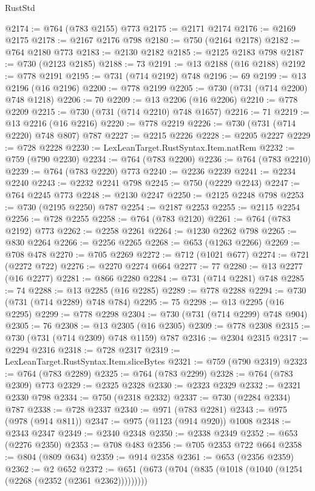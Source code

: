 \begin{lexlean}{RustStd}
\begin{coremodule}
@2174 := @764 (@783 @2155) @773
@2175 := @2171 @2174
@2176 := @2169 @2175
@2178 := @2167 @2176 @798
@2180 := @750 (@2164 @2178)
@2182 := @764 @2180 @773
@2183 := @2130 @2182
@2185 := @2125 @2183 @798
@2187 := @730 (@2123 @2185)
@2188 := 73
@2191 := @13 @2188 (@16 @2188)
@2192 := @778 @2191
@2195 := @731 (@714 @2192) @748
@2196 := 69
@2199 := @13 @2196 (@16 @2196)
@2200 := @778 @2199
@2205 := @730 (@731 (@714 @2200) @748 @1218)
@2206 := 70
@2209 := @13 @2206 (@16 @2206)
@2210 := @778 @2209
@2215 := @730 (@731 (@714 @2210) @748 @1657)
@2216 := 71
@2219 := @13 @2216 (@16 @2216)
@2220 := @778 @2219
@2226 := @730 (@731 (@714 @2220) @748 @807) @787
@2227 := @2215 @2226
@2228 := @2205 @2227
@2229 := @728 @2228
@2230 := LexLeanTarget.RustSyntax.Item.natRem
@2232 := @759 (@790 @2230)
@2234 := @764 (@783 @2200)
@2236 := @764 (@783 @2210)
@2239 := @764 (@783 @2220) @773
@2240 := @2236 @2239
@2241 := @2234 @2240
@2243 := @2232 @2241 @798
@2245 := @750 (@2229 @2243)
@2247 := @764 @2245 @773
@2248 := @2130 @2247
@2250 := @2125 @2248 @798
@2253 := @730 (@2195 @2250) @787
@2254 := @2187 @2253
@2255 := @2115 @2254
@2256 := @728 @2255
@2258 := @764 (@783 @2120)
@2261 := @764 (@783 @2192) @773
@2262 := @2258 @2261
@2264 := @1230 @2262 @798
@2265 := @830 @2264
@2266 := @2256 @2265
@2268 := @653 (@1263 @2266)
@2269 := @708 @478
@2270 := @705 @2269
@2272 := @712 (@1021 @677)
@2274 := @721 (@2272 @722)
@2276 := @2270 @2274 @664
@2277 := 77
@2280 := @13 @2277 (@16 @2277)
@2281 := @866 @2280
@2284 := @731 (@714 @2281) @748
@2285 := 74
@2288 := @13 @2285 (@16 @2285)
@2289 := @778 @2288
@2294 := @730 (@731 (@714 @2289) @748 @784)
@2295 := 75
@2298 := @13 @2295 (@16 @2295)
@2299 := @778 @2298
@2304 := @730 (@731 (@714 @2299) @748 @904)
@2305 := 76
@2308 := @13 @2305 (@16 @2305)
@2309 := @778 @2308
@2315 := @730 (@731 (@714 @2309) @748 @1159) @787
@2316 := @2304 @2315
@2317 := @2294 @2316
@2318 := @728 @2317
@2319 := LexLeanTarget.RustSyntax.Item.sliceBytes
@2321 := @759 (@790 @2319)
@2323 := @764 (@783 @2289)
@2325 := @764 (@783 @2299)
@2328 := @764 (@783 @2309) @773
@2329 := @2325 @2328
@2330 := @2323 @2329
@2332 := @2321 @2330 @798
@2334 := @750 (@2318 @2332)
@2337 := @730 (@2284 @2334) @787
@2338 := @728 @2337
@2340 := @971 (@783 @2281)
@2343 := @975 (@978 (@914 @811))
@2347 := @975 (@1123 (@914 @920)) @1008
@2348 := @2343 @2347
@2349 := @2340 @2348
@2350 := @2338 @2349
@2352 := @653 (@2276 @2350)
@2353 := @708 @483
@2356 := @705 @2353 @722 @664
@2358 := @804 (@809 @634)
@2359 := @914 @2358
@2361 := @653 (@2356 @2359)
@2362 := @2 @652
@2372 := @651 (@673 (@704 (@835 (@1018 (@1040 (@1254 (@2268 (@2352 (@2361 @2362)))))))))

\end{coremodule}
\end{lexlean}
